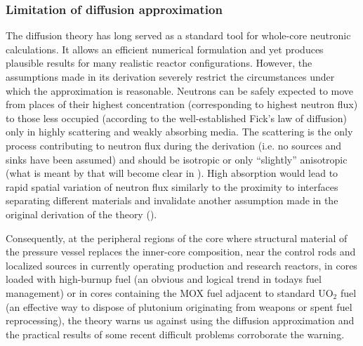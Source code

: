 \subsubsection*{Limitation of diffusion approximation} The diffusion theory has long served as a standard tool for
whole-core neutronic calculations. It allows an efficient numerical formulation and yet produces plausible results for
many realistic reactor configurations. However, the assumptions made in its derivation severely restrict the
circumstances under which the approximation is reasonable. Neutrons can be safely expected to move  from places of their
highest concentration (corresponding to highest neutron flux) to those less occupied (according to the well-established
Fick's law of diffusion) only in highly scattering and weakly absorbing media. The scattering is the only process
contributing to neutron flux during the derivation (i.e. no sources and sinks have been assumed) and should be isotropic
or only ``slightly'' anisotropic (what is meant by that will become clear in ).  High absorption would
lead to rapid spatial variation of neutron flux similarly to the proximity to interfaces separating different materials
and invalidate another assumption made in the original derivation of the theory (\cite[Chap. 3]{StaceyNRP}).

Consequently, at the peripheral regions of the core where structural material of the pressure vessel replaces the
inner-core composition, near the control rods and localized sources in currently operating production and research
reactors, in cores loaded with high-burnup fuel (an obvious and logical trend in todays fuel management) or in cores
containing the MOX fuel adjacent to standard
UO$_2$ fuel (an effective way to dispose of plutonium originating from weapons or spent fuel reprocessing), the theory
warns us against using the diffusion approximation and the practical results of some recent difficult problems
corroborate the warning.


